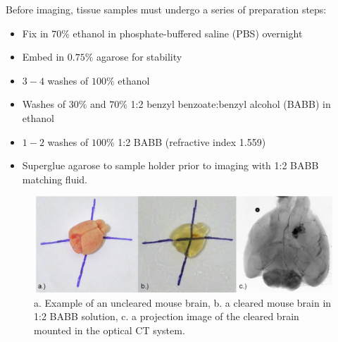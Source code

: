 Before imaging, tissue samples must undergo a series of preparation steps:
\begin{itemize}
	\item Fix in $70\%$ ethanol in phosphate-buffered saline (PBS) overnight
	\item Embed in $0.75\%$ agarose for stability
	\item $3-4$ washes of $100\%$ ethanol
	\item Washes of $30\%$ and $70\%$ 1:2 benzyl benzoate:benzyl alcohol (BABB) in ethanol
	\item $1-2$ washes of $100\%$ 1:2 BABB (refractive index 1.559)
	\item Superglue agarose to sample holder prior to imaging with 1:2 BABB matching fluid.
\end{itemize}







	\begin{figure}[H]
		\centering
		\includegraphics[width = \textwidth]{meth_img/Brain_J5_clearing.png}
		\caption{a. Example of an uncleared mouse brain, b. a cleared mouse brain in 1:2 BABB solution, c. a projection image of the cleared brain mounted in the optical CT system.}
		\label{fig:clearing}
	\end{figure}







